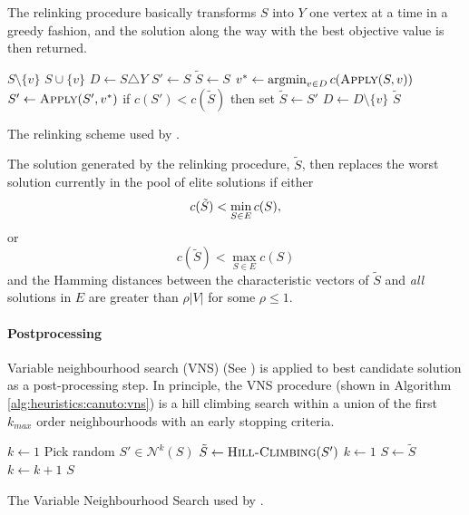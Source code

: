The relinking procedure basically transforms $S$ into $Y$ one vertex at a time in a greedy fashion,
 and the solution along the way with the best objective value is then returned.
 \begin{algorithm}[h!]
   \begin{algorithmic}[1]
     \State \Return $S \setminus \{v\}$
     \Else
     \State \Return $S \cup \{v\}$
     \EndIf
     \EndProcedure
     \State $D \gets S \triangle Y$
     \State $S' \gets S$
     \State $\tilde{S} \gets S$
     \State $v^* \gets \argmin_{v \in D} c(\Call{Apply}{S,v})$
     \State $S' \gets \Call{Apply}{S', v^*}$
     \State if $c(S') < c(\tilde{S})$ then set $\tilde{S} \gets S'$
     \State $D \gets D \setminus \{v\}$
     \EndWhile
     \State \Return $\tilde{S}$
     \EndProcedure
 \end{algorithmic}
 \caption{The relinking scheme used by \cite{canuto2001local}.}\label{heuristics:canuto:relink}
 \end{algorithm}

 The solution generated by the relinking procedure, $\tilde{S}$, then
 replaces the worst solution currently in the
 pool of elite solutions if either
 $$c(\tilde{S}) < \min_{S \in E} c(S)\mathnormal{,}$$
 or
 $$c(\tilde{S}) < \max_{S \in E} c(S)$$
  and the Hamming distances between the characteristic vectors of $\tilde{S}$
   and \textit{all} solutions in $E$ are greater than $\rho |V|$ for some $\rho \leq 1$. 

\paragraph{Postprocessing}
Variable neighbourhood search (VNS) (See \cite{hansen2010variable}) is applied
to best candidate solution as a post-processing step. In principle, the VNS
procedure (shown in Algorithm \ref{alg:heuristics:canuto:vns}) is a hill climbing
search within a union of the first $k_{max}$ order neighbourhoods with an early stopping
 criteria.
\begin{algorithm}[h!]
   \begin{algorithmic}[1]
     \State $k \gets 1$
     \State Pick random $S' \in \mathcal{N}^k(S)$
     \State $\tilde{S} \gets \Call{Hill-Climbing}{S'}$
     \State $k \gets 1$
     \State $S \gets \tilde{S}$
     \Else
     \State $k \gets k + 1$
     \EndIf
     \EndWhile
     \EndFor
     \State \Return $S$
     \EndProcedure
 \end{algorithmic}
 \caption{The Variable Neighbourhood Search
   used by \cite{canuto2001local}.}\label{alg:heuristics:canuto:vns}
 \end{algorithm}


